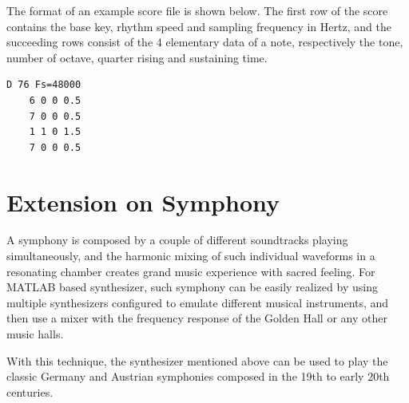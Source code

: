 \documentclass[conference]{IEEEtran}
\begin{document}


The format of an example score file is shown below. The first row of the score contains the base key, rhythm speed and sampling frequency in Hertz, and the succeeding rows consist of the 4 elementary data of a note, respectively the tone, number of octave, quarter rising and sustaining time.

\begin{lstlisting}[style=matlab]
	D 76 Fs=48000
	6 0 0 0.5
	7 0 0 0.5
	1 1 0 1.5
	7 0 0 0.5
\end{lstlisting}

\section{Extension on Symphony}

A symphony is composed by a couple of different soundtracks playing simultaneously, and the harmonic mixing of such individual waveforms in a resonating chamber creates grand music experience with sacred feeling. For MATLAB based synthesizer, such symphony can be easily realized by using multiple synthesizers configured to emulate different musical instruments, and then use a mixer with the frequency response of the Golden Hall or any other music halls.

With this technique, the synthesizer mentioned above can be used to play the classic Germany and Austrian symphonies composed in the 19th to early 20th centuries.




\end{document}
